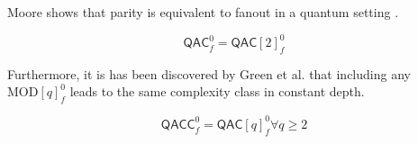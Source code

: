 Moore shows that parity is equivalent to fanout in a quantum setting \cite{Moore1999}.

\begin{equation}
\textsf{QAC}^0_f = \textsf{QAC}[2]^0_f
\end{equation}

Furthermore, it is has been discovered by Green et al. that including any $\text{MOD}[q]^0_f$
leads to the same complexity class in constant depth.

\begin{equation}
\textsf{QACC}^0_f = \textsf{QAC}[q]^0_f \forall q \ge 2
\end{equation}